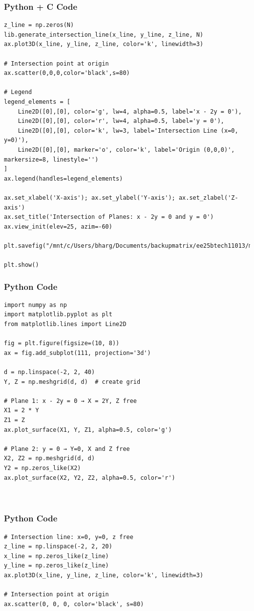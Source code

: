 \documentclass{beamer}
\begin{document}
\begin{frame}[fragile]
    \frametitle{Python + C Code}
    \begin{lstlisting}
z_line = np.zeros(N)
lib.generate_intersection_line(x_line, y_line, z_line, N)
ax.plot3D(x_line, y_line, z_line, color='k', linewidth=3)

# Intersection point at origin
ax.scatter(0,0,0,color='black',s=80)

# Legend
legend_elements = [
    Line2D([0],[0], color='g', lw=4, alpha=0.5, label='x - 2y = 0'),
    Line2D([0],[0], color='r', lw=4, alpha=0.5, label='y = 0'),
    Line2D([0],[0], color='k', lw=3, label='Intersection Line (x=0, y=0)'),
    Line2D([0],[0], marker='o', color='k', label='Origin (0,0,0)', markersize=8, linestyle='')
]
ax.legend(handles=legend_elements)

ax.set_xlabel('X-axis'); ax.set_ylabel('Y-axis'); ax.set_zlabel('Z-axis')
ax.set_title('Intersection of Planes: x - 2y = 0 and y = 0')
ax.view_init(elev=25, azim=-60)

plt.savefig("/mnt/c/Users/bharg/Documents/backupmatrix/ee25btech11013/matgeo/12.755/figs/Figure_1.png")

plt.show()
    \end{lstlisting}
\end{frame}
\begin{frame}[fragile]
    \frametitle{Python Code}
    \begin{lstlisting}
import numpy as np
import matplotlib.pyplot as plt
from matplotlib.lines import Line2D

fig = plt.figure(figsize=(10, 8))
ax = fig.add_subplot(111, projection='3d')

d = np.linspace(-2, 2, 40)
Y, Z = np.meshgrid(d, d)  # create grid

# Plane 1: x - 2y = 0 → X = 2Y, Z free
X1 = 2 * Y
Z1 = Z
ax.plot_surface(X1, Y, Z1, alpha=0.5, color='g')

# Plane 2: y = 0 → Y=0, X and Z free
X2, Z2 = np.meshgrid(d, d)
Y2 = np.zeros_like(X2)
ax.plot_surface(X2, Y2, Z2, alpha=0.5, color='r')



    \end{lstlisting}
\end{frame}
\begin{frame}[fragile]
    \frametitle{Python Code}
    \begin{lstlisting}
# Intersection line: x=0, y=0, z free
z_line = np.linspace(-2, 2, 20)
x_line = np.zeros_like(z_line)
y_line = np.zeros_like(z_line)
ax.plot3D(x_line, y_line, z_line, color='k', linewidth=3)

# Intersection point at origin
ax.scatter(0, 0, 0, color='black', s=80)

    \end{lstlisting}
\end{frame}
\end{document}
